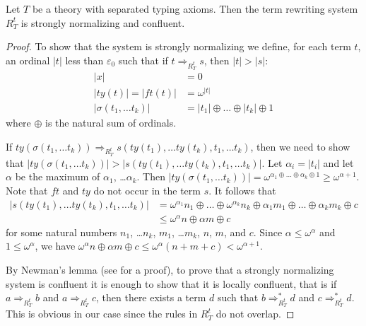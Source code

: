 \documentclass[reqno]{amsart}
\theoremstyle{definition}
\theoremstyle{remark}
\newcommand{\ft}{\mathit{ft}}
\newcommand{\ty}{\mathit{ty}}
\numberwithin{figure}{section}
\begin{document}
\begin{lem}
Let $T$ be a theory with separated typing axioms.
Then the term rewriting system $R^t_T$ is strongly normalizing and confluent.
\end{lem}
\begin{proof}
To show that the system is strongly normalizing we define, for each term $t$, an ordinal $|t|$ less than $\varepsilon_0$ such that if $t \Rightarrow_{R^t_T} s$, then $|t| > |s|$:
\begin{align*}
|x| & = 0 \\
|\ty(t)| = |\ft(t)| & = \omega^{|t|}\\
|\sigma(t_1, \ldots t_k)| & = |t_1| \oplus \ldots \oplus |t_k| \oplus 1
\end{align*}
where $\oplus$ is the natural sum of ordinals.

If $\ty(\sigma(t_1, \ldots t_k)) \Rightarrow_{R_T^t} s(\ty(t_1), \ldots \ty(t_k), t_1, \ldots t_k)$, then we need to show that $|\ty(\sigma(t_1, \ldots t_k))| > |s(\ty(t_1), \ldots \ty(t_k), t_1, \ldots t_k)|$.
Let $\alpha_i = |t_i|$ and let $\alpha$ be the maximum of $\alpha_1$, \ldots $\alpha_k$.
Then $|\ty(\sigma(t_1, \ldots t_k))| = \omega^{\alpha_1 \oplus \ldots \oplus \alpha_k \oplus 1} \geq \omega^{\alpha + 1}$.
Note that $\ft$ and $\ty$ do not occur in the term $s$.
It follows that
\begin{align*}
|s(\ty(t_1), \ldots \ty(t_k), t_1, \ldots t_k)| & = \omega^{\alpha_1} n_1 \oplus \ldots \oplus \omega^{\alpha_k} n_k \oplus \alpha_1 m_1 \oplus \ldots \oplus \alpha_k m_k \oplus c \\
                                              & \leq \omega^\alpha n \oplus \alpha m \oplus c
\end{align*}
for some natural numbers $n_1$, \ldots $n_k$, $m_1$, \ldots $m_k$, $n$, $m$, and $c$.
Since $\alpha \leq \omega^\alpha$ and $1 \leq \omega^\alpha$, we have $\omega^\alpha n \oplus \alpha m \oplus c \leq \omega^\alpha (n + m + c) < \omega^{\alpha + 1}$.

By Newman's lemma (see \cite[Lemma~2.2.5]{ohlebusch-advanced} for a proof), to prove that a strongly normalizing system is confluent it is enough to show that it is locally confluent,
that is if $a \Rightarrow_{R^t_T} b$ and $a \Rightarrow_{R^t_T} c$, then there exists a term $d$ such that $b \Rightarrow_{R^t_T}^* d$ and $c \Rightarrow_{R^t_T}^* d$.
This is obvious in our case since the rules in $R^t_T$ do not overlap.
\end{proof}
\end{document}
